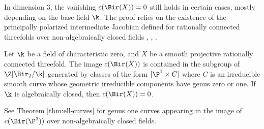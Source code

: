 In dimension $3$,
the vanishing $c(\Bir(X)) = 0$ still holds in certain cases,
mostly depending on the base field $\k$.
The proof relies on the existence
of the principally
polarized intermediate Jacobian defined for
rationally connected threefolds over non-algebraically
closed
fields \cite{AchterCMVial}, \cite{AchterCMVial-2}, \cite{BenoistWittenbergPerf}.

\begin{proposition}
\notready\label{prop:ratconn3-fold}
Let $\k$ be a field of characteristic zero,
and $X$ be a smooth projective
rationally connected threefold.
The image $c(\Bir(X))$ is contained
in the subgroup of $\Z[\Bir_{2}/\k]$ generated
by classes of the form
$[\P^1 \times C]$ where $C$
is an irreducible smooth curve
whose geometric
irreducible components have genus zero or one.
If $\k$ is algebraically closed, then
$c(\Bir(X)) = 0$.
\end{proposition}

See Theorem \ref{thm:ell-curves} for genus one
curves appearing in the image of $c(\Bir(\P^3))$
over non-algebraically closed fields.




